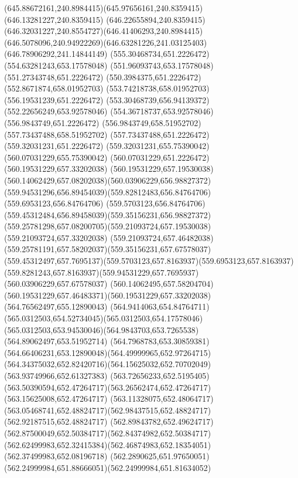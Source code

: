 {{	\curveto(645.88672161,240.8984415)(645.97656161,240.8359415)(646.13281227,240.8359415)
	\curveto(646.22655894,240.8359415)(646.32031227,240.8554727)(646.41406293,240.8984415)
	\curveto(646.5078096,240.94922269)(646.63281226,241.03125403)(646.78906292,241.14844149)
	\closepath
	\moveto(555.30468734,651.2226472)
	\lineto(554.63281243,653.17578048)
	\lineto(551.96093743,653.17578048)
	\lineto(551.27343748,651.2226472)
	\lineto(550.3984375,651.2226472)
	\lineto(552.8671874,658.01952703)
	\lineto(553.74218738,658.01952703)
	\lineto(556.19531239,651.2226472)
	\closepath
	\moveto(553.30468739,656.94139372)
	\lineto(552.22656249,653.92578046)
	\lineto(554.36718737,653.92578046)
	\closepath
	\moveto(556.9843749,651.2226472)
	\lineto(556.9843749,658.51952702)
	\lineto(557.73437488,658.51952702)
	\lineto(557.73437488,651.2226472)
	\closepath
	\moveto(559.32031231,651.2226472)
	\lineto(559.32031231,655.75390042)
	\lineto(560.07031229,655.75390042)
	\lineto(560.07031229,651.2226472)
	\closepath
	\moveto(560.19531229,657.33202038)
	\curveto(560.19531229,657.19530038)(560.14062429,657.08202038)(560.03906229,656.98827372)
	\curveto(559.94531296,656.89454039)(559.82812483,656.84764706)(559.6953123,656.84764706)
	\curveto(559.5703123,656.84764706)(559.45312484,656.89458039)(559.35156231,656.98827372)
	\curveto(559.25781298,657.08200705)(559.21093724,657.19530038)(559.21093724,657.33202038)
	\curveto(559.21093724,657.46482038)(559.25781191,657.58202037)(559.35156231,657.67578037)
	\curveto(559.45312497,657.7695137)(559.5703123,657.8163937)(559.6953123,657.8163937)
	\curveto(559.8281243,657.8163937)(559.94531229,657.7695937)(560.03906229,657.67578037)
	\curveto(560.14062495,657.58204704)(560.19531229,657.46483371)(560.19531229,657.33202038)
	\closepath
	\moveto(564.76562497,655.12890043)
	\curveto(564.9414063,654.84764711)(565.0312503,654.52734045)(565.0312503,654.17578046)
	\curveto(565.0312503,653.94530046)(564.9843703,653.7265538)(564.89062497,653.51952714)
	\curveto(564.7968783,653.30859381)(564.66406231,653.12890048)(564.49999965,652.97264715)
	\curveto(564.34375032,652.82420716)(564.15625032,652.70702049)(563.93749966,652.61327383)
	\curveto(563.72656233,652.5195405)(563.50390594,652.47264717)(563.26562474,652.47264717)
	\lineto(563.15625008,652.47264717)
	\curveto(563.11328075,652.48064717)(563.05468741,652.48824717)(562.98437515,652.48824717)
	\lineto(562.92187515,652.48824717)
	\curveto(562.89843782,652.49624717)(562.87500049,652.50384717)(562.84374982,652.50384717)
	\curveto(562.62499983,652.32415384)(562.46874983,652.18354051)(562.37499983,652.08196718)
	\curveto(562.2890625,651.97650051)(562.24999984,651.88666051)(562.24999984,651.81634052)
}}
